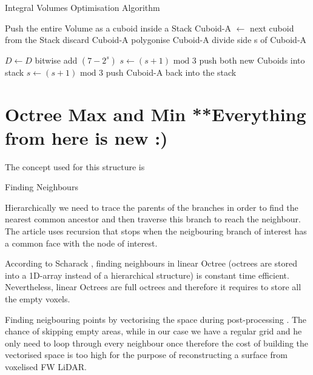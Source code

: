\documentclass{subfiles}
\begin{document}
\begin{algorithm}[!htbp]
	\caption{Integral Volumes Optimisation Algorithm}
	\label{alg:IVoptAdvance}
	\centering
	\begin{algorithmic}[1]
		\State Push the entire Volume as a cuboid inside a Stack
			\State Cuboid-A   $\gets$  next cuboid from the Stack 
				\State	discard Cuboid-A
				\State polygonise Cuboid-A
				\State	divide side s of Cuboid-A 
		
					\State	$D \gets D$ bitwise add $(7-2^s)$
				\EndIf
				\State 	$s \gets (s+1) \text{ mod } 3$
				\State push both new Cuboids into stack
			\Else 
				\State $s \gets (s+1) \text{ mod } 3$
				\State push Cuboid-A back into the stack
			\EndIf
		\EndWhile
	\end{algorithmic}
\end{algorithm}

\newpage

\rhead{ }
\section{Octree Max and Min {\color{red} **Everything from here is new :)}} \label{sec:OctreeMaxMin}



The concept used for this structure is 



Finding Neighbours 

Hierarchically we need to trace the parents of the branches in order to find the nearest common ancestor and then traverse this branch to reach the neighbour. The article \cite{Hanan1989} uses recursion that stops when the neigbouring branch of interest has a common face with the node of interest. 


According to Scharack \cite{Schrack1992}, finding neighbours in linear Octree (octrees are stored into a 1D-array instead of a hierarchical structure) is constant time efficient. Nevertheless, linear Octrees are full octrees and therefore it requires to store all the empty voxels. 

Finding neigbouring points by vectorising the space during post-processing \cite{Lohner1994}. The chance of skipping empty areas, while in our case we have a regular grid and he only need to loop through every neighbour once therefore the cost of building the vectorised space is too high for the purpose of reconstructing a surface from voxelised FW LiDAR. 
\end{document}
